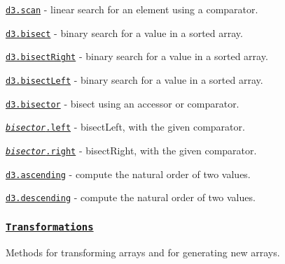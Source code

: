 \begin{DoxyItemize}
\item \href{https://github.com/d3/d3-array/blob/master/README.md#scan}{\tt d3.\+scan} -\/ linear search for an element using a comparator.
\item \href{https://github.com/d3/d3-array/blob/master/README.md#bisect}{\tt d3.\+bisect} -\/ binary search for a value in a sorted array.
\item \href{https://github.com/d3/d3-array/blob/master/README.md#bisectRight}{\tt d3.\+bisect\+Right} -\/ binary search for a value in a sorted array.
\item \href{https://github.com/d3/d3-array/blob/master/README.md#bisectLeft}{\tt d3.\+bisect\+Left} -\/ binary search for a value in a sorted array.
\item \href{https://github.com/d3/d3-array/blob/master/README.md#bisector}{\tt d3.\+bisector} -\/ bisect using an accessor or comparator.
\item \href{https://github.com/d3/d3-array/blob/master/README.md#bisector_left}{\tt {\itshape bisector}.left} -\/ bisect\+Left, with the given comparator.
\item \href{https://github.com/d3/d3-array/blob/master/README.md#bisector_right}{\tt {\itshape bisector}.right} -\/ bisect\+Right, with the given comparator.
\item \href{https://github.com/d3/d3-array/blob/master/README.md#ascending}{\tt d3.\+ascending} -\/ compute the natural order of two values.
\item \href{https://github.com/d3/d3-array/blob/master/README.md#descending}{\tt d3.\+descending} -\/ compute the natural order of two values.
\end{DoxyItemize}

\subsubsection*{\href{https://github.com/d3/d3-array/blob/master/README.md#transformations}{\tt Transformations}}

Methods for transforming arrays and for generating new arrays.


